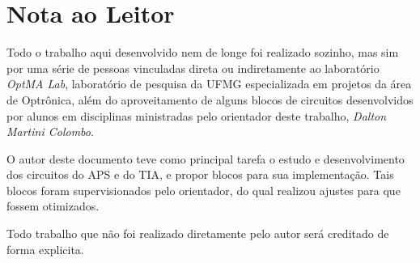 \chapter*[Nota ao Leitor]{Nota ao Leitor}

Todo o trabalho aqui desenvolvido nem de longe foi realizado sozinho, mas sim por uma série de pessoas vinculadas direta ou indiretamente ao laboratório 
\emph{OptMA Lab}, laboratório de pesquisa da UFMG especializada em projetos da área de Optrônica, além do aproveitamento de alguns blocos de circuitos desenvolvidos por alunos em disciplinas ministradas pelo orientador deste trabalho, \emph{Dalton Martini Colombo}.

O autor deste documento teve como principal tarefa o estudo e desenvolvimento dos circuitos do APS e do TIA, e propor blocos para sua implementação. Tais blocos foram supervisionados pelo orientador, do qual realizou ajustes para que fossem otimizados.

Todo trabalho que não foi realizado diretamente pelo autor será creditado de forma explicita.
